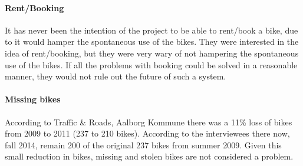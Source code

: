 \paragraph{Rent/Booking}
It has never been the intention of the project to be able to rent/book a bike, due to it would hamper the spontaneous use of the bikes.
They were interested in the idea of rent/booking, but they were very wary of not hampering the spontaneous use of the bikes.
If all the problems with booking could be solved in a reasonable manner, they would not rule out the future of such a system.


\paragraph{Missing bikes}
According to Traffic \& Roads, Aalborg Kommune\cite{cykelplanlaegning} there was a 11\% loss of bikes from 2009 to 2011 (237 to 210 bikes).
According to the interviewees there now, fall 2014, remain 200 of the original 237 bikes from summer 2009. 
Given this small reduction in bikes, missing and stolen bikes are not considered a problem.